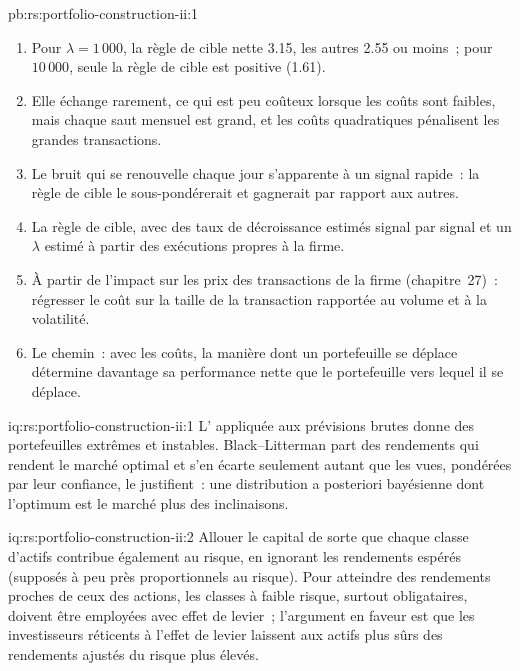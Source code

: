 \begin{solution}{pb:rs:portfolio-construction-ii:1}
\begin{enumerate}
$\lambda = 100$, le  dégage un ratio de Sharpe net de 4.06 contre $-0.51$ pour la réoptimisation quotidienne.
\item Pour $\lambda = 1\,000$, la règle de cible nette 3.15, les autres 2.55 ou moins~; pour $10\,000$, seule la règle de cible est positive (1.61).
\item Elle échange rarement, ce qui est peu coûteux lorsque les coûts sont faibles, mais chaque saut mensuel est grand, et les coûts quadratiques pénalisent les grandes transactions.
\item Le bruit qui se renouvelle chaque jour s'apparente à un signal rapide~: la règle de cible le sous-pondérerait et gagnerait par rapport aux autres.
\item La règle de cible, avec des taux de décroissance estimés signal par signal et un $\lambda$ estimé à partir des exécutions propres à la firme.
\item À partir de l'impact sur les prix des transactions de la firme (chapitre~27)~: régresser le coût sur la taille de la transaction rapportée au volume et à la volatilité.
\item Le chemin~: avec les coûts, la manière dont un portefeuille se déplace détermine davantage sa performance nette que le portefeuille vers lequel il se déplace.
\end{enumerate}
\end{solution}

\begin{solution}{iq:rs:portfolio-construction-ii:1}
L' appliquée aux prévisions brutes donne des portefeuilles extrêmes et instables. Black--Litterman part des rendements qui rendent le marché optimal et s'en écarte seulement autant que
les vues, pondérées par leur confiance, le justifient~: une distribution a posteriori bayésienne dont l'optimum est le marché plus des inclinaisons.
\end{solution}

\begin{solution}{iq:rs:portfolio-construction-ii:2}
Allouer le capital de sorte que chaque classe d'actifs contribue également au risque, en ignorant les rendements espérés (supposés à peu près proportionnels au risque). Pour atteindre des rendements proches de ceux des actions, les
classes à faible risque, surtout obligataires, doivent être employées avec effet de levier~; l'argument en faveur est que les investisseurs réticents à l'effet de levier laissent aux actifs plus sûrs des rendements ajustés du risque plus élevés.
\end{solution}

